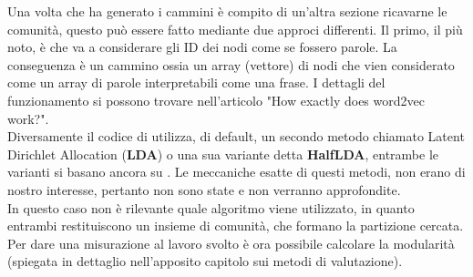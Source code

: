%
Una volta che \nv ha generato i cammini è compito di un'altra sezione ricavarne le comunità, questo può essere fatto mediante due approci differenti. Il primo, il più noto, è \textbf{\wv} che va a considerare gli ID dei nodi come se fossero parole. La conseguenza è un cammino ossia un array (vettore) di nodi che vien considerato come un array di parole interpretabili come una frase. I dettagli del funzionamento si possono trovare nell'articolo "How exactly does word2vec work?"\cite{W2V_paper}.\\
Diversamente il codice di \cnrl utilizza, di default, un secondo metodo chiamato Latent Dirichlet Allocation (\textbf{LDA})\cite{LDA} o una sua variante detta \textbf{HalfLDA}, entrambe le varianti si basano ancora su \wv. Le meccaniche esatte di questi metodi, non erano di nostro interesse, pertanto non sono state e non verranno approfondite.\\
In questo caso non è rilevante quale algoritmo viene utilizzato, in quanto entrambi restituiscono un insieme di comunità, che formano la partizione cercata. Per dare una misurazione al lavoro svolto è ora possibile calcolare la modularità (spiegata in dettaglio nell'apposito capitolo sui metodi di valutazione).
%

